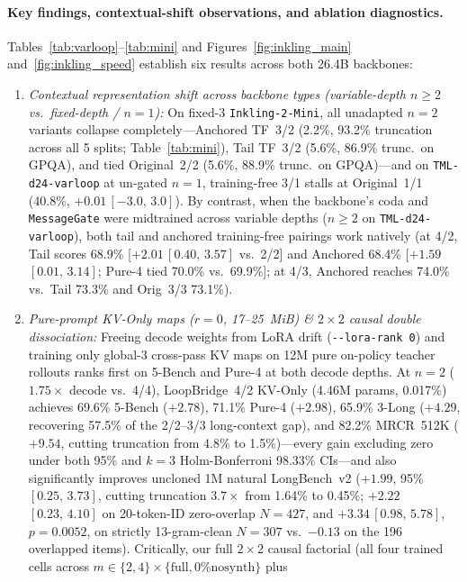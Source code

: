 \documentclass[11pt]{article}
\newcommand{\ci}[2]{\,{\scriptsize\ensuremath{[#1,\,#2]}}}
\begin{document}
\paragraph{Key findings, contextual-shift observations, and ablation diagnostics.}
Tables~\ref{tab:varloop}--\ref{tab:mini} and Figures~\ref{fig:inkling_main} and~\ref{fig:inkling_speed} establish six
results across both 26.4B backbones:
\begin{enumerate}
\item \emph{Contextual representation shift across backbone types (variable-depth $n{\ge}2$ vs.\ fixed-depth / $n{=}1$):} On fixed-3 \texttt{Inkling-2-Mini},
all unadapted $n{=}2$ variants collapse completely---Anchored TF~3/2 (2.2\%, 93.2\% truncation across all 5 splits;
Table~\ref{tab:mini}), Tail TF~3/2 (5.6\%, 86.9\% trunc.\ on GPQA), and tied Original~2/2 (5.6\%, 88.9\% trunc.\ on
GPQA)---and on \texttt{TML-d24-varloop} at un-gated $n{=}1$, training-free 3/1 stalls at Original~1/1 (40.8\%,
$+0.01$\ci{-3.0}{3.0}). By contrast, when the backbone's coda and \texttt{MessageGate} were midtrained across variable
depths ($n\ge2$ on \texttt{TML-d24-varloop}), both tail and anchored training-free pairings work natively (at 4/2, Tail
scores 68.9\% [$+2.01$\ci{0.40}{3.57} vs.\ 2/2] and Anchored 68.4\% [$+1.59$\ci{0.01}{3.14}; Pure-4 tied 70.0\% vs.\
69.9\%]; at 4/3, Anchored reaches 74.0\% vs.\ Tail 73.3\% and Orig~3/3 73.1\%).
\item \emph{Pure-prompt KV-Only maps ($r{=}0$, 17--25~MiB) \& $2\times2$ causal double dissociation:} Freeing decode
weights from LoRA drift (\texttt{-\/-lora-rank 0}) and training only global-3 cross-pass KV maps on 12M pure on-policy
teacher rollouts ranks first on 5-Bench and Pure-4 at both decode depths. At $n{=}2$ ($1.75\times$ decode vs.\ 4/4),
LoopBridge~4/2 KV-Only (4.46M params, 0.017\%) achieves 69.6\% 5-Bench ($+2.78$), 71.1\% Pure-4 ($+2.98$), 65.9\% 3-Long
($+4.29$, recovering 57.5\% of the 2/2--3/3 long-context gap), and 82.2\% MRCR~512K ($+9.54$, cutting truncation from
4.8\% to 1.5\%)---every gain excluding zero under both 95\% and $k{=}3$ Holm-Bonferroni 98.33\% CIs---and also
significantly improves uncloned 1M natural LongBench~v2 ($+1.99$, 95\% \ci{0.25}{3.73}, cutting truncation $3.7\times$
from 1.64\% to 0.45\%; $+2.22$\ci{0.23}{4.10} on 20-token-ID zero-overlap $N{=}427$, and $+3.34$\ci{0.98}{5.78},
$p{=}0.0052$, on strictly 13-gram-clean $N{=}307$ vs.\ $-0.13$ on the 196 overlapped items). Critically, our full
$2\times2$ causal factorial (all four trained cells across $m\in\{2,4\}\times\{\text{full}, \text{0\% nosynth}\}$ plus

\end{enumerate}
\end{document}
